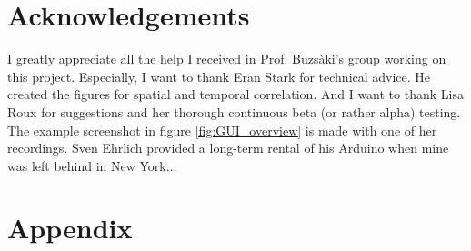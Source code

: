 \section*{Acknowledgements}
\label{sec:acknowledgements}
I greatly appreciate all the help I received in Prof. Buzs\`aki's group working on this project. Especially, I want to thank Eran Stark for technical advice. He created the figures for spatial and temporal correlation. And I want to thank Lisa Roux for suggestions and her thorough continuous beta (or rather alpha) testing. The example screenshot in figure \ref{fig:GUI_overview} is made with one of her recordings. Sven Ehrlich provided a long-term rental of his Arduino when mine was left behind in New York...
%



%
%
%
%
%
%
%
%
%
%
%
%
\clearpage
\section*{Appendix}
\label{sec:Appendix}



